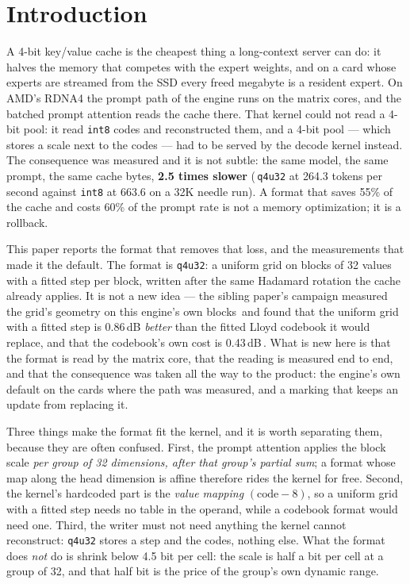 \documentclass[10pt,twocolumn]{article}
\begin{document}
\section{Introduction}

A 4-bit key/value cache is the cheapest thing a long-context server can do: it halves the memory that
competes with the expert weights, and on a card whose experts are streamed from the SSD every freed
megabyte is a resident expert. On AMD's RDNA4 the prompt path of the engine runs on the matrix cores, and
the batched prompt attention reads the cache there. That kernel could not read a 4-bit pool: it read
\texttt{int8} codes and reconstructed them, and a 4-bit pool --- which stores a scale next to the codes ---
had to be served by the decode kernel instead. The consequence was measured and it is not subtle: the same
model, the same prompt, the same cache bytes, \textbf{2.5 times slower} (\,\texttt{q4u32} at 264.3 tokens per
second against \texttt{int8} at 663.6 on a 32K needle run). A format that saves 55\% of the cache and costs
60\% of the prompt rate is not a memory optimization; it is a rollback.

This paper reports the format that removes that loss, and the measurements that made it the default.
The format is \texttt{q4u32}: a uniform grid on blocks of 32 values with a fitted step per block, written
after the same Hadamard rotation the cache already applies. It is not a new idea --- the sibling paper's
campaign measured the grid's geometry on this engine's own blocks\,\cite{shear} and found that the uniform
grid with a fitted step is 0.86\,dB \emph{better} than the fitted Lloyd codebook it would replace, and that
the codebook's own cost is 0.43\,dB\,\cite{shear}. What is new here is that the format is read by the
matrix core, that the reading is measured end to end, and that the consequence was taken all the way to
the product: the engine's own default on the cards where the path was measured, and a marking that keeps
an update from replacing it.

Three things make the format fit the kernel, and it is worth separating them, because they are often
confused. First, the prompt attention applies the block scale \emph{per group of 32 dimensions, after that
group's partial sum}; a format whose map along the head dimension is affine therefore rides the kernel for
free. Second, the kernel's hardcoded part is the \emph{value mapping} $(\text{code}-8)$, so a uniform grid
with a fitted step needs no table in the operand, while a codebook format would need one. Third, the
writer must not need anything the kernel cannot reconstruct: \texttt{q4u32} stores a step and the codes,
nothing else. What the format does \emph{not} do is shrink below 4.5 bit per cell: the scale is half a bit
per cell at a group of 32, and that half bit is the price of the group's own dynamic range.
\end{document}
